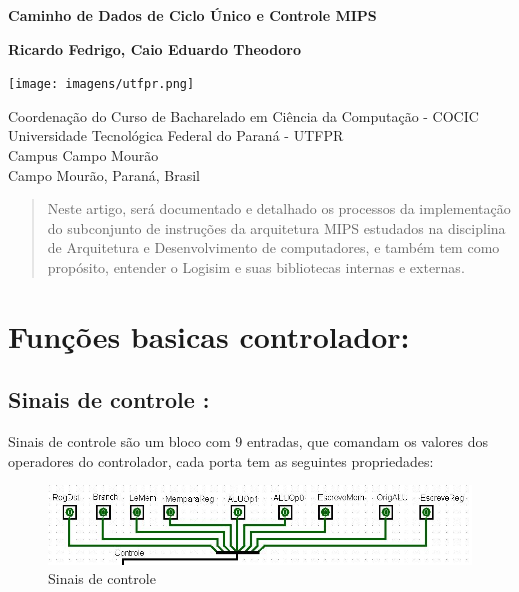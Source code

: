 \documentclass[
	article,
	11pt,
	oneside,
	a4paper,
	english,
	brazil,
	]{abntex2}
\begin{document}
\begin{titlepage}
    \begin{center}
        \vspace*{1cm}
            
        \Huge
        \textbf{Caminho de Dados de Ciclo Único e Controle MIPS}
            
        \vspace{0.5cm}
        \LARGE
            
        \vspace{1.5cm}
            
        \textbf{Ricardo Fedrigo, Caio Eduardo Theodoro}
            
        \vfill
            
        \vspace{0.8cm}
            
        \texttt{[image: imagens/utfpr.png]}
            
        \Large
        Coordenação do Curso de Bacharelado em Ciência da Computação - COCIC\\
        Universidade Tecnológica Federal do Paraná - UTFPR\\ 
        Campus Campo Mourão\\
        Campo Mourão, Paraná, Brasil\\            
    \end{center}
\end{titlepage}
\begin{abstract}
    Neste artigo, será documentado e detalhado os processos da implementação do subconjunto de instruções da arquitetura MIPS estudados na disciplina de Arquitetura e Desenvolvimento de computadores, e também tem como propósito, entender o Logisim e suas bibliotecas internas e externas.
\end{abstract}
\section{Funções basicas controlador:}
\subsection{Sinais de controle :}
Sinais de controle são um bloco com 9 entradas, que comandam os valores dos operadores do controlador, cada porta tem as seguintes propriedades:

        \begin{figure}[!htb]
        \centering
        \includegraphics[scale=0.5]{imagens/SinaisDeControle.JPG}
        \caption{Sinais de controle}
        \label{fig:hostnetid}
        \end{figure}
        
\end{document}
